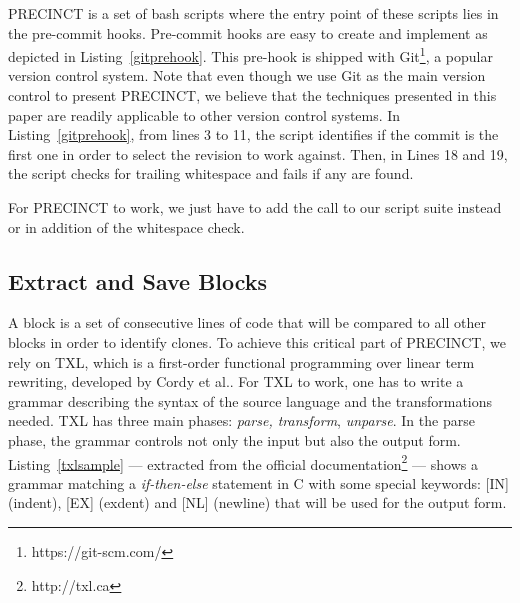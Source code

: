\documentclass[conference]{IEEEtran}
\begin{document}
PRECINCT is a set of bash scripts where the entry point of these scripts lies in the pre-commit hooks. Pre-commit hooks are easy to create and implement as depicted in Listing~\ref{gitprehook}.
This pre-hook is shipped with Git\footnote{https://git-scm.com/}, a popular version control system.
Note that even though we use Git as the main version control to present PRECINCT, we believe that the techniques presented in this paper are readily applicable to other version control systems.
In Listing~\ref{gitprehook}, from lines 3 to 11, the script identifies if the commit is the first one in order to select the revision to work against.
Then, in Lines 18 and 19, the script checks for trailing whitespace and fails if any are found.

\noindent\begin{minipage}{0.90\linewidth}

  

\end{minipage}

For PRECINCT to work, we just have to add the call to our script suite instead or in addition of the whitespace check.

\subsection{Extract and Save Blocks}
\label{sub:Extract and Save Blocks}

A block is a set of consecutive lines of code that will be compared to all other blocks in order to identify clones.
To achieve this critical part of PRECINCT, we rely on TXL\cite{Cordy2006a}, which is a first-order functional programming over linear term rewriting, developed by Cordy et al.\cite{Cordy2006a}.
For TXL to work, one has to write a grammar describing the syntax of the source  language and the transformations needed. TXL has three main phases: \textit{parse, transform}, \textit{unparse}.
In the parse phase, the grammar controls not only the input but also the output form.
Listing~\ref{txlsample} --- extracted from the official documentation\footnote{http://txl.ca} --- shows a grammar matching a \textit{if-then-else} statement in C with some special keywords: [IN] (indent), [EX] (exdent) and [NL] (newline) that will be used for the output form.

\noindent\begin{minipage}{0.90\linewidth}

  

\end{minipage}
\end{document}
